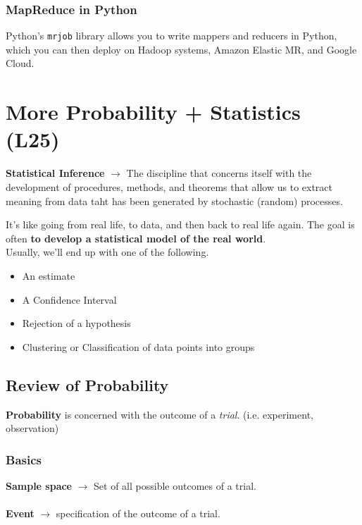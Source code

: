 \documentclass[english, 10pt]{article}
\begin{document}
\subsubsection{MapReduce in Python}

Python's \texttt{mrjob} library allows you to write mappers and reducers in Python, which you can then deploy on Hadoop systems, Amazon Elastic MR, and Google Cloud.

\section{More Probability + Statistics (L25)}

\begin{tcolorbox}[title=Definition:,colframe=red!75!black,colback=red!5!white,arc=0pt,fonttitle=\bfseries]
\textbf{Statistical Inference} $\rightarrow$ The discipline that concerns itself with the development of procedures, methods, and theorems that allow us to extract meaning from data taht has been generated by stochastic (random) processes.
\end{tcolorbox}

\hfill \break It's like going from real life, to data, and then back to real life again. The goal is often \textbf{to develop a statistical model of the real world}.\\

Usually, we'll end up with one of the following.
\begin{itemize}
	\item An estimate
	\item A Confidence Interval
	\item Rejection of a hypothesis
	\item Clustering or Classification of data points into groups
\end{itemize}

\subsection{Review of Probability}

\textbf{Probability} is concerned with the outcome of a \textit{trial}. (i.e. experiment, observation)\\

\subsubsection{Basics}

\begin{tcolorbox}[title=Definitions:,colframe=red!75!black,colback=red!5!white,arc=0pt,fonttitle=\bfseries]
\textbf{Sample space} $\rightarrow$ Set of all possible outcomes of a trial.\\\\
\textbf{Event} $\rightarrow$ specification of the outcome of a trial.
\end{tcolorbox}
\end{document}
